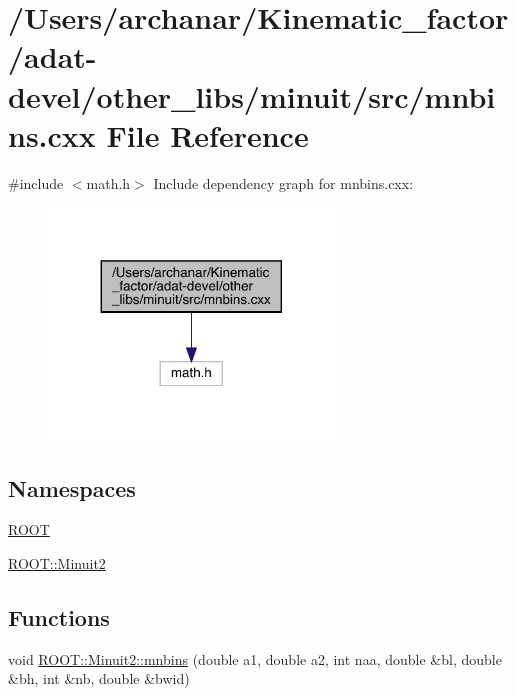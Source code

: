 \hypertarget{adat-devel_2other__libs_2minuit_2src_2mnbins_8cxx}{}\section{/\+Users/archanar/\+Kinematic\+\_\+factor/adat-\/devel/other\+\_\+libs/minuit/src/mnbins.cxx File Reference}
\label{adat-devel_2other__libs_2minuit_2src_2mnbins_8cxx}
{\ttfamily \#include $<$math.\+h$>$}\newline
Include dependency graph for mnbins.\+cxx\+:
\nopagebreak
\begin{figure}[H]
\begin{center}
\leavevmode
\includegraphics[width=215pt]{da/d99/adat-devel_2other__libs_2minuit_2src_2mnbins_8cxx__incl}
\end{center}
\end{figure}
\subsection*{Namespaces}
\begin{DoxyCompactItemize}
\item 
 \mbox{\hyperlink{namespaceROOT}{R\+O\+OT}}
\item 
 \mbox{\hyperlink{namespaceROOT_1_1Minuit2}{R\+O\+O\+T\+::\+Minuit2}}
\end{DoxyCompactItemize}
\subsection*{Functions}
\begin{DoxyCompactItemize}
\item 
void \mbox{\hyperlink{namespaceROOT_1_1Minuit2_ac22433ee68c6274fa7028a58763d04bd}{R\+O\+O\+T\+::\+Minuit2\+::mnbins}} (double a1, double a2, int naa, double \&bl, double \&bh, int \&nb, double \&bwid)
\end{DoxyCompactItemize}
